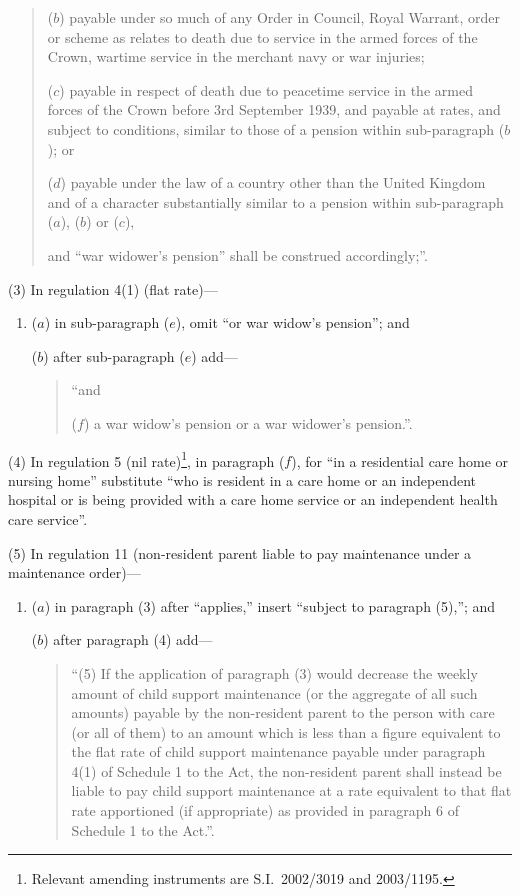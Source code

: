 \documentclass[12pt,a4paper]{article}
\begin{document}
\begin{enumerate}
\begin{quotation}
\begin{enumerate}
($b$) 
payable under so much of any Order in Council, Royal Warrant, order or scheme as relates to death due to service in the armed forces of the Crown, wartime service in the merchant navy or war injuries;

($c$) 
payable in respect of death due to peacetime service in the armed forces of the Crown before 3rd September 1939, and payable at rates, and subject to conditions, similar to those of a pension within sub-paragraph ($b$); or

($d$) 
payable under the law of a country other than the United Kingdom and of a character substantially similar to a pension within sub-paragraph ($a$), ($b$)  or ($c$),
\end{enumerate}
and “war widower’s pension” shall be construed accordingly;”.
\end{quotation}
\end{enumerate}

(3) In regulation 4(1) (flat rate)—
\begin{enumerate}\item[]
($a$) in sub-paragraph ($e$), omit “or war widow’s pension”; and

($b$) after sub-paragraph ($e$)  add—
\begin{quotation}
    “and

    ($f$) 
    a war widow’s pension or a war widower’s pension.”. 
\end{quotation}
\end{enumerate}

(4) In regulation 5 (nil rate)\footnote{Relevant amending instruments are S.I.\ 2002/3019 and 2003/1195.}, in paragraph ($f$), for “in a residential care home or nursing home” substitute “who is resident in a care home or an independent hospital or is being provided with a care home service or an independent health care service”.

(5) In regulation 11 (non-resident parent liable to pay maintenance under a maintenance order)—
\begin{enumerate}\item[]
($a$) in paragraph (3) after “applies,” insert “subject to paragraph (5),”; and

($b$) after paragraph (4) add—
\begin{quotation}
“(5) If the application of paragraph (3) would decrease the weekly amount of child support maintenance (or the aggregate of all such amounts) payable by the non-resident parent to the person with care (or all of them) to an amount which is less than a figure equivalent to the flat rate of child support maintenance payable under paragraph 4(1) of Schedule 1 to the Act, the non-resident parent shall instead be liable to pay child support maintenance at a rate equivalent to that flat rate apportioned (if appropriate) as provided in paragraph 6 of Schedule 1 to the Act.”.
\end{quotation}
\end{enumerate}
\end{document}
